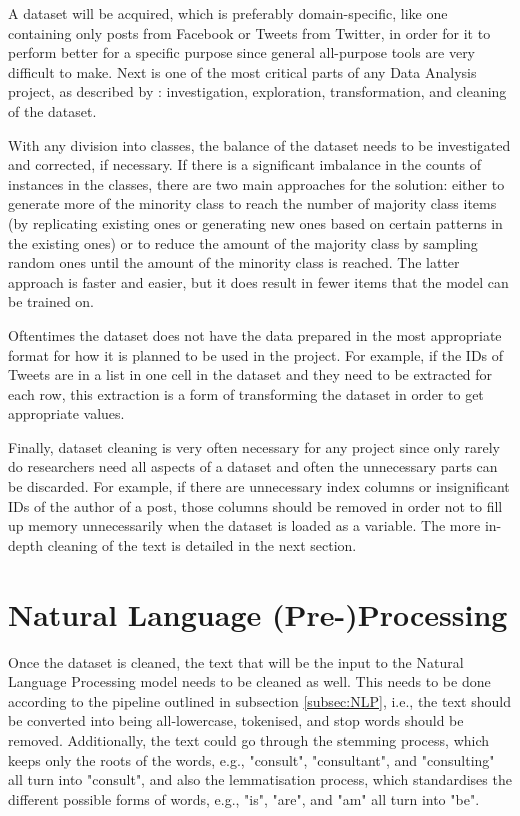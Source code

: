 \documentclass{l4proj}
\begin{document}
A dataset will be acquired, which is preferably domain-specific, like one containing only posts from Facebook or Tweets from Twitter, in order for it to perform better for a specific purpose since general all-purpose tools are very difficult to make. Next is one of the most critical parts of any Data Analysis project, as described by \citet{BigData}: investigation, exploration, transformation, and cleaning of the dataset.

With any division into classes, the balance of the dataset needs to be investigated and corrected, if necessary. If there is a significant imbalance in the counts of instances in the classes, there are two main approaches for the solution: either to generate more of the minority class to reach the number of majority class items (by replicating existing ones or generating new ones based on certain patterns in the existing ones) or to reduce the amount of the majority class by sampling random ones until the amount of the minority class is reached. The latter approach is faster and easier, but it does result in fewer items that the model can be trained on.

Oftentimes the dataset does not have the data prepared in the most appropriate format for how it is planned to be used in the project. For example, if the IDs of Tweets are in a list in one cell in the dataset and they need to be extracted for each row, this extraction is a form of transforming the dataset in order to get appropriate values.

Finally, dataset cleaning is very often necessary for any project since only rarely do researchers need all aspects of a dataset and often the unnecessary parts can be discarded. For example, if there are unnecessary index columns or insignificant IDs of the author of a post, those columns should be removed in order not to fill up memory unnecessarily when the dataset is loaded as a variable. The more in-depth cleaning of the text is detailed in the next section.

\section{Natural Language (Pre-)Processing}
\label{sec:design_NLP}

Once the dataset is cleaned, the text that will be the input to the Natural Language Processing model needs to be cleaned as well. This needs to be done according to the pipeline outlined in subsection \ref{subsec:NLP}, i.e., the text should be converted into being all-lowercase, tokenised, and stop words should be removed. Additionally, the text could go through the stemming process, which keeps only the roots of the words, e.g., "consult", "consultant", and "consulting" all turn into "consult", and also the lemmatisation process, which standardises the different possible forms of words, e.g., "is", "are", and "am" all turn into "be".
\end{document}
